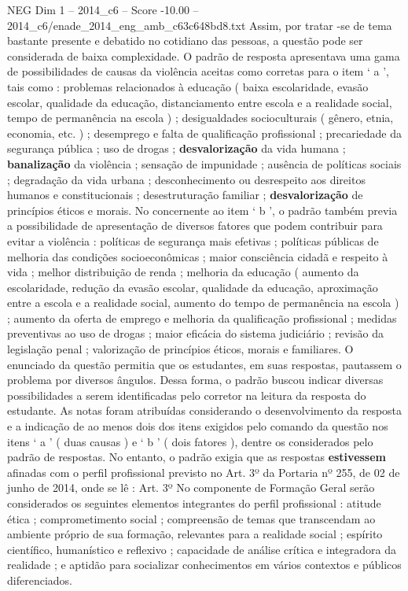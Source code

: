 \begin{textsample}{NEG Dim 1 – 2014\_c6 – Score -10.00 – 2014\_c6/enade\_2014\_eng\_amb\_c63c648bd8.txt}
Assim, por tratar -se de tema bastante presente e debatido no cotidiano das pessoas, a questão pode ser considerada de baixa complexidade.
O padrão de resposta apresentava uma gama de possibilidades de causas da violência aceitas como corretas para o item ‘ a ’, tais como : problemas relacionados à educação ( baixa escolaridade, evasão escolar, qualidade da educação, distanciamento entre escola e a realidade social, tempo de permanência na escola ) ; desigualdades socioculturais ( gênero, etnia, economia, etc. ) ; desemprego e falta de qualificação profissional ; precariedade da segurança pública ; uso de drogas ; \textbf{desvalorização} da vida humana ; \textbf{banalização} da violência ; sensação de impunidade ; ausência de políticas sociais ; degradação da vida urbana ; desconhecimento ou desrespeito aos direitos humanos e constitucionais ; desestruturação familiar ; \textbf{desvalorização} de princípios éticos e morais.
No concernente ao item ‘ b ’, o padrão também previa a possibilidade de apresentação de diversos fatores que podem contribuir para evitar a violência : políticas de segurança mais efetivas ; políticas públicas de melhoria das condições socioeconômicas ; maior consciência cidadã e respeito à vida ; melhor distribuição de renda ; melhoria da educação ( aumento da escolaridade, redução da evasão escolar, qualidade da educação, aproximação entre a escola e a realidade social, aumento do tempo de permanência na escola ) ; aumento da oferta de emprego e melhoria da qualificação profissional ; medidas preventivas ao uso de drogas ; maior eficácia do sistema judiciário ; revisão da legislação penal ; valorização de princípios éticos, morais e familiares.
O enunciado da questão permitia que os estudantes, em suas respostas, pautassem o problema por diversos ângulos.
Dessa forma, o padrão buscou indicar diversas possibilidades a serem identificadas pelo corretor na leitura da resposta do estudante.
As notas foram atribuídas considerando o desenvolvimento da resposta e a indicação de ao menos dois dos itens exigidos pelo comando da questão nos itens ‘ a ’ ( duas causas ) e ‘ b ’ ( dois fatores ), dentre os considerados pelo padrão de respostas.
No entanto, o padrão exigia que as respostas \textbf{estivessem} afinadas com o perfil profissional previsto no Art. 3º da Portaria nº 255, de 02 de junho de 2014, onde se lê : Art. 3º No componente de Formação Geral serão considerados os seguintes elementos integrantes do perfil profissional : atitude ética ; comprometimento social ; compreensão de temas que transcendam ao ambiente próprio de sua formação, relevantes para a realidade social ; espírito científico, humanístico e reflexivo ; capacidade de análise crítica e integradora da realidade ; e aptidão para socializar conhecimentos em vários contextos e públicos diferenciados.

\end{textsample}
